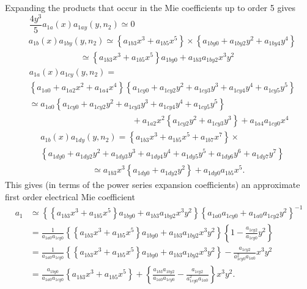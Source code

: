 \documentclass[aps,preprint]{revtex4}%
\begin{document}
Expanding the products that occur in the Mie coefficients up to order 5 gives
\begin{equation}
\frac{4y^{3}}{5}a_{1a}\left(  x\right)  a_{1ay}\left(  y,n_{2}\right)
\simeq0\qquad\qquad\qquad\qquad\qquad\qquad\qquad\qquad\qquad
\end{equation}%
\begin{align}
&  a_{1b}\left(  x\right)  a_{1by}\left(  y,n_{2}\right)  \simeq\left\{
a_{1b3}x^{3}+a_{1b5}x^{5}\right\}  \times\left\{  a_{1by0}+a_{1by2}%
y^{2}+a_{1by4}y^{4}\right\} \nonumber\\
&  \left.  \qquad\qquad\qquad\right.  \simeq\left\{  a_{1b3}x^{3}+a_{1b5}%
x^{5}\right\}  a_{1by0}+a_{1b3}a_{1by2}x^{3}y^{2}%
\end{align}%
\begin{align}
&  a_{1a}\left(  x\right)  a_{1cy}\left(  y,n_{2}\right)  =\nonumber\\
&  \left\{  a_{1a0}+a_{1a2}x^{2}+a_{1a4}x^{4}\right\}  \left\{  a_{1cy0}%
+a_{1cy2}y^{2}+a_{1cy3}y^{3}+a_{1cy4}y^{4}+a_{1cy5}y^{5}\right\} \nonumber\\
&  \simeq a_{1a0}\left\{  a_{1cy0}+a_{1cy2}y^{2}+a_{1cy3}y^{3}+a_{1cy4}%
y^{4}+a_{1cy5}y^{5}\right\} \nonumber\\
&  \qquad\qquad\qquad\qquad\qquad\qquad+a_{1a2}x^{2}\left\{  a_{1cy2}%
y^{2}+a_{1cy3}y^{3}\right\}  +a_{1a4}a_{1cy0}x^{4}%
\end{align}%
\begin{align}
&  a_{1b}\left(  x\right)  a_{1dy}\left(  y,n_{2}\right)  =\left\{
a_{1b3}x^{3}+a_{1b5}x^{5}+a_{1b7}x^{7}\right\}  \times\nonumber\\
&  \left\{  a_{1dy0}+a_{1dy2}y^{2}+a_{1dy3}y^{3}+a_{1dy4}y^{4}+a_{1dy5}%
y^{5}+a_{1dy6}y^{6}+a_{1dy7}y^{7}\right\} \nonumber\\
&  \left.  \qquad\qquad\qquad\right.  \simeq a_{1b3}x^{3}\left\{
a_{1dy0}+a_{1dy2}y^{2}\right\}  +a_{1dy0}a_{1b5}x^{5}.
\end{align}
This gives (in terms of the power series expansion coefficients) an
approximate first order electrical Mie coefficient
\begin{align}
a_{1}  &  \simeq\left\{  \left\{  a_{1b3}x^{3}+a_{1b5}x^{5}\right\}
a_{1by0}+a_{1b3}a_{1by2}x^{3}y^{2}\right\}  \left\{  a_{1a0}a_{1cy0}%
+a_{1a0}a_{1cy2}y^{2}\right\}  ^{-1}\nonumber\\
&  =\frac{1}{a_{1a0}a_{1cy0}}\left\{  \left\{  a_{1b3}x^{3}+a_{1b5}%
x^{5}\right\}  a_{1by0}+a_{1b3}a_{1by2}x^{3}y^{2}\right\}  \left\{
1-\frac{a_{1cy2}}{a_{1cy0}}y^{2}\right\} \nonumber\\
&  =\frac{1}{a_{1a0}a_{1cy0}}\left\{  \left\{  a_{1b3}x^{3}+a_{1b5}%
x^{5}\right\}  a_{1by0}+a_{1b3}a_{1by2}x^{3}y^{2}\right\}  -\frac{a_{1cy2}%
}{a_{1cy0}^{2}a_{1a0}}x^{3}y^{2}\nonumber\\
&  =\frac{a_{1by0}}{a_{1a0}a_{1cy0}}\left\{  a_{1b3}x^{3}+a_{1b5}%
x^{5}\right\}  +\left\{  \frac{a_{1b3}a_{1by2}}{a_{1a0}a_{1cy0}}%
-\frac{a_{1cy2}}{a_{1cy0}^{2}a_{1a0}}\right\}  x^{3}y^{2}.
\end{align}
\end{document}
